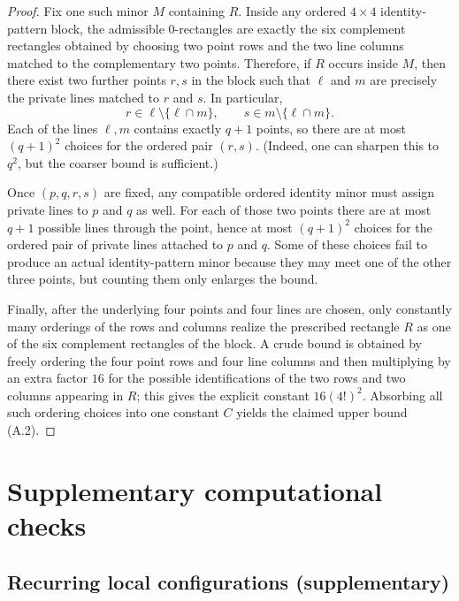 \documentclass[11pt]{amsart}
\numberwithin{equation}{section}
\theoremstyle{plain}
\theoremstyle{definition}
\theoremstyle{remark}
\begin{document}
\begin{proof}
Fix one such minor $M$ containing $R$.
Inside any ordered $4\times4$ identity-pattern block, the admissible $0$-rectangles are exactly the six complement rectangles obtained by choosing two point rows and the two line columns matched to the complementary two points.
Therefore, if $R$ occurs inside $M$, then there exist two further points $r,s$ in the block such that $\ell$ and $m$ are precisely the private lines matched to $r$ and $s$.
In particular,
\[
r\in \ell\setminus\{\ell\cap m\},
\qquad
s\in m\setminus\{\ell\cap m\}.
\]
Each of the lines $\ell,m$ contains exactly $q+1$ points, so there are at most $(q+1)^2$ choices for the ordered pair $(r,s)$.
(Indeed, one can sharpen this to $q^2$, but the coarser bound is sufficient.)

Once $(p,q,r,s)$ are fixed, any compatible ordered identity minor must assign private lines to $p$ and $q$ as well.
For each of those two points there are at most $q+1$ possible lines through the point, hence at most $(q+1)^2$ choices for the ordered pair of private lines attached to $p$ and $q$.
Some of these choices fail to produce an actual identity-pattern minor because they may meet one of the other three points, but counting them only enlarges the bound.

Finally, after the underlying four points and four lines are chosen, only constantly many orderings of the rows and columns realize the prescribed rectangle $R$ as one of the six complement rectangles of the block.
A crude bound is obtained by freely ordering the four point rows and four line columns and then multiplying by an extra factor $16$ for the possible identifications of the two rows and two columns appearing in $R$; this gives the explicit constant $16(4!)^2$.
Absorbing all such ordering choices into one constant $C$ yields the claimed upper bound \textup{(A.2)}.
\end{proof}




\section{Supplementary computational checks}
\label{sec:app:computations}


\subsection{Recurring local configurations (supplementary)}
\end{document}
